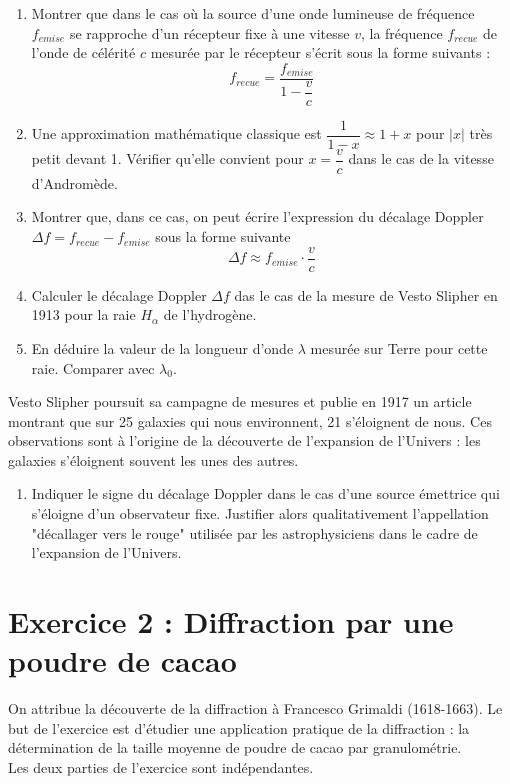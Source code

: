 \documentclass[a4paper,11pt,fleqn]{article}%
\begin{document}
    \begin{enumerate}[resume]
        \item Montrer que dans le cas où la source d'une onde lumineuse de fréquence $f_{emise}$ se rapproche d'un récepteur fixe à une vitesse $v$, la fréquence $f_{recue}$ de l'onde de célérité $c$ mesurée par le récepteur s'écrit sous la forme suivants : $$f_{recue} = \dfrac{f_{emise}}{1-\dfrac{v}{c}}$$
        \item Une approximation mathématique classique est $\dfrac{1}{1-x} \approx 1 + x$ pour $|x|$ très petit devant 1. Vérifier qu'elle convient pour $x = \dfrac{v}{c}$ dans le cas de la vitesse d'Andromède.
        \item Montrer que, dans ce cas, on peut écrire l'expression du décalage Doppler $\Delta f = f_{recue} - f_{emise}$ sous la forme suivante $$ \Delta f \approx f_{emise} \cdot \dfrac{v}{c}$$
        \item Calculer le décalage Doppler $\Delta f$ das le cas de la mesure de Vesto Slipher en 1913 pour la raie $H_{\alpha}$ de l'hydrogène.
        \item En déduire la valeur de la longueur d'onde $\lambda$ mesurée sur Terre pour cette raie. Comparer avec $\lambda_0$.
    \end{enumerate}

    Vesto Slipher poursuit sa campagne de mesures et publie en 1917 un article montrant que sur 25 galaxies qui nous environnent, 21 s'éloignent de nous. Ces observations sont à l'origine de la découverte de l'expansion de l'Univers : les galaxies s'éloignent souvent les unes des autres.

    \begin{enumerate}[resume]
        \item Indiquer le signe du décalage Doppler dans le cas d'une source émettrice qui s'éloigne d'un observateur fixe. Justifier alors qualitativement l'appellation "décallager vers le rouge" utilisée par les astrophysiciens dans le cadre de l'expansion de l'Univers.
    \end{enumerate}

\section*{Exercice 2 : Diffraction par une poudre de cacao}
On attribue la découverte de la diffraction à Francesco Grimaldi (1618-1663). Le but de l'exercice est d'étudier une application pratique de la diffraction : la détermination de la taille moyenne de poudre de cacao par granulométrie.\\
Les deux parties de l'exercice sont indépendantes.
\end{document}
